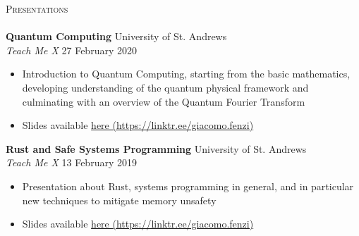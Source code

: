 \documentclass[a4paper]{article}
\newcommand{\lineunder} {
    \vspace*{-8pt} \\
    \hspace*{-18pt} \hrulefill \\
}
\newcommand{\header} [1] {
    {\hspace*{-18pt}\vspace*{6pt} \textsc{#1}}
    \vspace*{-6pt} \lineunder
}
\begin{document}
\header{Presentations}

\textbf{Quantum Computing} \hfill University of St. Andrews \\
\textit{Teach Me X} \hfill{27 February 2020}
\vspace{-1mm}
\begin{itemize} \itemsep 1pt
    \item Introduction to Quantum Computing, starting from the basic mathematics, developing understanding of the quantum physical framework
    and culminating with an overview of the Quantum Fourier Transform
    \item Slides available \href{https://github.com/WizardOfMenlo/QuantumPresentationTMX}{here (https://linktr.ee/giacomo.fenzi)} 
\end{itemize}

\textbf{Rust and Safe Systems Programming} \hfill University of St. Andrews \\
\textit{Teach Me X} \hfill{13 February 2019}
\vspace{-1mm}
\begin{itemize} \itemsep 1pt
    \item Presentation about Rust, systems programming in general, and in particular new techniques to mitigate memory unsafety
    \item Slides available \href{https://docs.google.com/presentation/d/1ui4ByY8qFhqAsdYoyPBPzhyg8AbV5YJKAN9sNwv5QPw/edit?usp=sharing}{here (https://linktr.ee/giacomo.fenzi)} 
\end{itemize}
\end{document}
